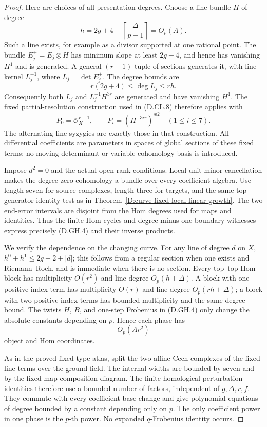 \begin{proof}
Here are choices of all presentation degrees.
Choose a line bundle \(H\) of degree
\[
 h=2g+4+\left\lceil\frac{\Delta}{p-1}\right\rceil
       =O_p(A).
                                                        \tag{D.GH.6}
\]
Such a line exists, for example as a divisor supported
at one rational point. The bundle \(E_j^+=E_j\otimes H\)
has minimum slope at least \(2g+4\), and hence has
vanishing \(H^1\) and is generated. A general
\((r+1)\)-tuple of sections generates it, with line
kernel \(L_j^{-1}\), where \(L_j=\det E_j^+\).
The degree bounds are
\[
       r(2g+4)\le\deg L_j\le rh.
                                                        \tag{D.GH.7}
\]
Consequently both \(L_j\) and \(L_j^{-1}H^{3r}\)
are generated and have vanishing \(H^1\).
The fixed partial-resolution construction used in
(D.CL.8) therefore applies with
\[
 P_0=\mathcal O_X^{r+1},\qquad
 P_i=(H^{-3ir})^{\oplus2}\quad(1\le i\le7).             \tag{D.GH.8}
\]
The alternating line syzygies are exactly those in that
construction. All differential coefficients are
parameters in spaces of global sections of these fixed
terms; no moving determinant or variable cohomology
basis is introduced.

Impose \(d^2=0\) and the actual open rank conditions.
Local unit-minor cancellation makes the degree-zero
cohomology a bundle over every coefficient algebra.
Use length seven for source complexes, length three for
targets, and the same top-generator identity test as in
Theorem~\ref{D:curve-fixed-local-linear-growth}.
The two end-error intervals are disjoint from the Hom
degrees used for maps and identities. Thus the finite
Hom cycles and degree-minus-one boundary witnesses
express precisely (D.GH.4) and their inverse products.

We verify the dependence on the changing curve.
For any line of degree \(d\) on \(X\),
\(h^0+h^1\le2g+2+|d|\); this follows from a regular
section when one exists and Riemann--Roch, and is
immediate when there is no section.
Every top--top Hom block has multiplicity \(O(r^2)\)
and line degree \(O_p(h+\Delta)\). A block with one
positive-index term has multiplicity \(O(r)\) and
line degree \(O_p(rh+\Delta)\); a block with two
positive-index terms has bounded multiplicity and
the same degree bound. The twists \(H\), \(B\), and
one-step Frobenius in (D.GH.4) only change the
absolute constants depending on \(p\). Hence each
phase has
\[
                   O_p(A r^2)                         \tag{D.GH.9}
\]
object and Hom coordinates.

As in the proved fixed-type atlas, split the two-affine
Cech complexes of the fixed line terms over the ground
field. The internal widths are bounded by seven and by
the fixed map-composition diagram. The finite homological
perturbation identities therefore use a bounded number
of factors, independent of \(g,\Delta,r,f\).
They commute with every coefficient-base change and
give polynomial equations of degree bounded by a constant
depending only on \(p\). The only coefficient power in
one phase is the \(p\)-th power. No expanded \(q\)-Frobenius
identity occurs.


\end{proof}
